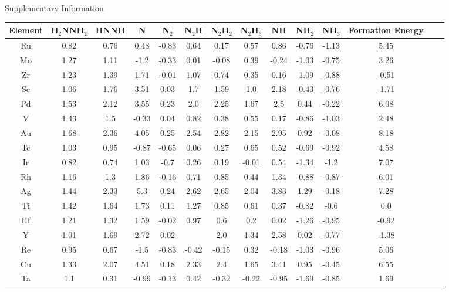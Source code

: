 Supplementary Information
\onecolumn
\begin{table}
\begin{center}
\begin{tabular}{| c | c | c | c | c | c | c | c | c | c | c | c | c | c |}
\hline
Element & H$_2$NNH$_2$ & HNNH & N & N$_2$ & N$_2$H & N$_2$H$_2$ & N$_2$H$_3$ & NH & NH$_2$ & NH$_3$ & Formation Energy\\
\hline

Ru & 0.82 & 0.76 & 0.48 & -0.83 & 0.64 & 0.17 & 0.57 & 0.86 & -0.76 & -1.13 & 5.45 \\
Mo & 1.27 & 1.11 & -1.2 & -0.33 & 0.01 & -0.08 & 0.39 & -0.24 & -1.03 & -0.75 & 3.26 \\
Zr & 1.23 & 1.39 & 1.71 & -0.01 & 1.07 & 0.74 & 0.35 & 0.16 & -1.09 & -0.88 & -0.51 \\
Sc & 1.06 & 1.76 & 3.51 & 0.03 & 1.7 & 1.59 & 1.0 & 2.18 & -0.43 & -0.76 & -1.71 \\
Pd & 1.53 & 2.12 & 3.55 & 0.23 & 2.0 & 2.25 & 1.67 & 2.5 & 0.44 & -0.22 & 6.08 \\
V & 1.43 & 1.5 & -0.33 & 0.04 & 0.82 & 0.38 & 0.55 & 0.17 & -0.86 & -1.03 & 2.48 \\
Au & 1.68 & 2.36 & 4.05 & 0.25 & 2.54 & 2.82 & 2.15 & 2.95 & 0.92 & -0.08 & 8.18 \\
Tc & 1.03 & 0.95 & -0.87 & -0.65 & 0.06 & 0.27 & 0.65 & 0.52 & -0.69 & -0.92 & 4.58 \\
Ir & 0.82 & 0.74 & 1.03 & -0.7 & 0.26 & 0.19 & -0.01 & 0.54 & -1.34 & -1.2 & 7.07 \\
Rh & 1.16 & 1.3 & 1.86 & -0.16 & 0.71 & 0.85 & 0.44 & 1.34 & -0.88 & -0.87 & 6.01 \\
Ag & 1.44 & 2.33 & 5.3 & 0.24 & 2.62 & 2.65 & 2.04 & 3.83 & 1.29 & -0.18 & 7.28 \\
Ti & 1.42 & 1.64 & 1.73 & 0.11 & 1.27 & 0.85 & 0.61 & 0.37 & -0.82 & -0.6 & 0.0 \\
Hf & 1.21 & 1.32 & 1.59 & -0.02 & 0.97 & 0.6 & 0.2 & 0.02 & -1.26 & -0.95 & -0.92 \\
Y & 1.01 & 1.69 & 2.72 & 0.02 &  & 2.0 & 1.34 & 2.58 & 0.02 & -0.77 & -1.38 \\
Re & 0.95 & 0.67 & -1.5 & -0.83 & -0.42 & -0.15 & 0.32 & -0.18 & -1.03 & -0.96 & 5.06 \\
Cu & 1.33 & 2.07 & 4.51 & 0.18 & 2.33 & 2.4 & 1.65 & 3.41 & 0.95 & -0.45 & 6.55 \\
Ta & 1.1 & 0.31 & -0.99 & -0.13 & 0.42 & -0.32 & -0.22 & -0.95 & -1.69 & -0.85 & 1.69 \\

\end{tabular}
\end{center}
\end{table}
